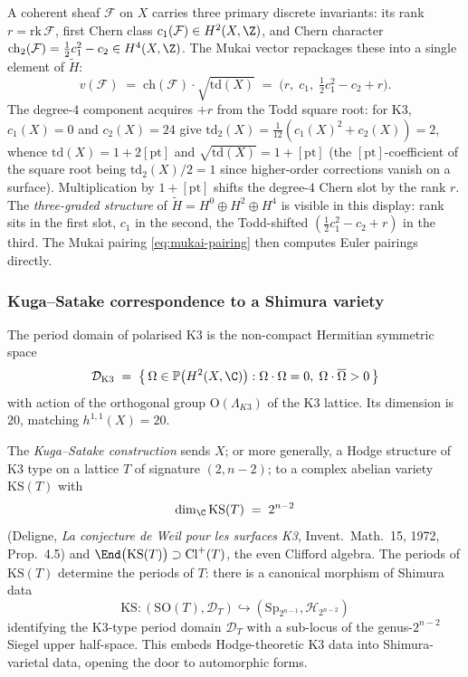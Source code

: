 A coherent sheaf $\mathcal F$ on $X$ carries three primary discrete invariants: its rank $r = \mathrm{rk}\, \mathcal F$, first Chern class $c_1(\mathcal F) \in H^2(X, \Z)$, and Chern character $\mathrm{ch}_2(\mathcal F) = \tfrac12 c_1^2 - c_2 \in H^4(X, \Z)$. The Mukai vector repackages these into a single element of $\widetilde H$:
\[
 v(\mathcal F) \;=\; \mathrm{ch}(\mathcal F) \cdot \sqrt{\mathrm{td}(X)} \;=\; \bigl(r, \; c_1, \; \tfrac12 c_1^2 - c_2 + r\bigr).
\]
The degree-$4$ component acquires $+r$ from the Todd square root: for K3, $c_1(X) = 0$ and $c_2(X) = 24$ give $\mathrm{td}_2(X) = \tfrac{1}{12}(c_1(X)^2 + c_2(X)) = 2$, whence $\mathrm{td}(X) = 1 + 2[\mathrm{pt}]$ and $\sqrt{\mathrm{td}(X)} = 1 + [\mathrm{pt}]$ (the $[\mathrm{pt}]$-coefficient of the square root being $\mathrm{td}_2(X)/2 = 1$ since higher-order corrections vanish on a surface). Multiplication by $1 + [\mathrm{pt}]$ shifts the degree-$4$ Chern slot by the rank $r$. The \emph{three-graded structure} of $\widetilde H = H^0 \oplus H^2 \oplus H^4$ is visible in this display: rank sits in the first slot, $c_1$ in the second, the Todd-shifted $(\tfrac12 c_1^2 - c_2 + r)$ in the third. The Mukai pairing \eqref{eq:mukai-pairing} then computes Euler pairings directly.

\subsubsection{Kuga--Satake correspondence to a Shimura variety}

The period domain of polarised K3 is the non-compact Hermitian symmetric space
\[
 \mathcal D_{\mathrm{K3}} \;=\; \bigl\{\,\Omega \in \mathbb P\bigl(H^2(X, \C)\bigr) : \Omega \cdot \Omega = 0,\; \Omega \cdot \overline\Omega > 0\,\bigr\}
\]
with action of the orthogonal group $\mathrm{O}(\Lambda_{K3})$ of the K3 lattice. Its dimension is $20$, matching $h^{1,1}(X) = 20$.

The \emph{Kuga--Satake construction} sends $X$; or more generally, a Hodge structure of K3 type on a lattice $T$ of signature $(2, n - 2)$; to a complex abelian variety $\mathrm{KS}(T)$ with
\begin{equation}
 \dim_\C \mathrm{KS}(T) \;=\; 2^{n - 2}
 \label{eq:kuga-satake-dim}
\end{equation}
(Deligne, \emph{La conjecture de Weil pour les surfaces K3}, Invent.\ Math.\ 15, 1972, Prop.\ 4.5) and $\End\bigl(\mathrm{KS}(T)\bigr) \supset \mathrm{Cl}^+(T)$, the even Clifford algebra. The periods of $\mathrm{KS}(T)$ determine the periods of $T$: there is a canonical morphism of Shimura data
\[
 \mathrm{KS}\colon (\mathrm{SO}(T), \mathcal D_T) \hookrightarrow (\mathrm{Sp}_{2^{n-1}}, \mathcal H_{2^{n-2}})
\]
identifying the K3-type period domain $\mathcal D_T$ with a sub-locus of the genus-$2^{n-2}$ Siegel upper half-space. This embeds Hodge-theoretic K3 data into Shimura-varietal data, opening the door to automorphic forms.

